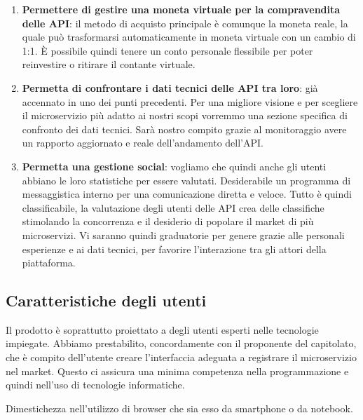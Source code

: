 \documentclass[12pt,a4paper,titlepage]{article}
\begin{document}
\begin{enumerate}
		\item \textbf{Permettere di gestire una moneta virtuale per la compravendita delle API}:	il metodo di acquisto principale è comunque la moneta reale, la quale può trasformarsi automaticamente in moneta virtuale con un cambio di 1:1. È possibile quindi tenere un conto personale flessibile per poter reinvestire o ritirare il contante virtuale. 
		\item \textbf{Permetta di confrontare i dati tecnici delle API tra loro}:	già accennato in uno dei punti precedenti. Per una migliore visione e per scegliere il microservizio più adatto ai nostri scopi vorremmo una sezione specifica di confronto dei dati tecnici. Sarà nostro compito grazie al monitoraggio avere un rapporto aggiornato e reale dell'andamento dell'API.
		\item \textbf{Permetta una gestione social}:	vogliamo che quindi anche gli utenti abbiano le loro statistiche per essere valutati. Desiderabile un programma di messaggistica interno per una comunicazione diretta e veloce. Tutto è quindi classificabile, la valutazione degli utenti delle API crea delle classifiche stimolando la concorrenza e il desiderio di popolare il market di più microservizi. Vi saranno quindi graduatorie per genere grazie alle personali esperienze e ai dati tecnici, per favorire l'interazione tra gli attori della piattaforma.
	\end{enumerate}
	\subsection{Caratteristiche degli utenti}
	Il prodotto è soprattutto proiettato a degli utenti esperti nelle tecnologie impiegate. Abbiamo prestabilito, concordamente con il proponente del capitolato, che è compito dell'utente creare l'interfaccia adeguata a registrare il microservizio nel market. Questo ci assicura una minima competenza nella programmazione e quindi nell'uso di tecnologie informatiche.
	
	Dimestichezza nell'utilizzo di browser che sia esso da smartphone o da notebook. 
\end{document}
